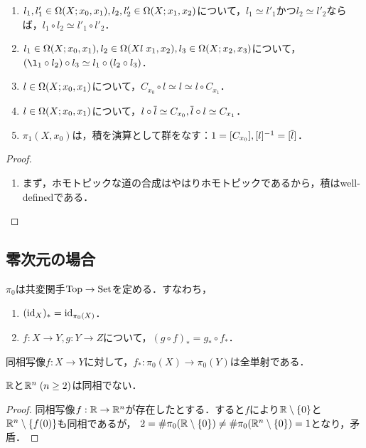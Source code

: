 \documentclass[uplatex,dvipdfmx]{jsreport}
\begin{document}
\begin{lemma}\mbox{}
    \begin{enumerate}
        \item $l_1,l'_1\in\Omega(X;x_0,x_1),l_2,l'_2\in\Omega(X;x_1,x_2)$について，$l_1\simeq l'_1$かつ$l_2\simeq l'_2$ならば，$l_1\circ l_2\simeq l'_1\circ l'_2$．
        \item $l_1\in\Omega(X;x_0,x_1),l_2\in\Omega(Xl\;x_1,x_2),l_3\in\Omega(X;x_2,x_3)$について，$(\l_1\circ l_2)\circ l_3\simeq l_1\circ(l_2\circ l_3)$．
        \item $l\in\Omega(X;x_0,x_1)$について，$C_{x_0}\circ l\simeq l\simeq l\circ C_{x_1}$．
        \item $l\in\Omega(X;x_0,x_1)$について，$l\circ\overline{l}\simeq C_{x_0},\overline{l}\circ l\simeq C_{x_1}$．
        \item $\pi_1(X,x_0)$は，積を演算として群をなす：$1=[C_{x_0}],[l]^{-1}=[\overline{l}]$．
    \end{enumerate}
\end{lemma}
\begin{proof}\mbox{}
    \begin{enumerate}
        \item まず，ホモトピックな道の合成はやはりホモトピックであるから，積はwell-definedである．
    \end{enumerate}
\end{proof}

\subsection{零次元の場合}

\begin{lemma}
    $\pi_0$は共変関手$\mathrm{Top}\to\mathrm{Set}$を定める．すなわち，
    \begin{enumerate}
        \item $(\mathrm{id}_X)_*=\mathrm{id}_{\pi_0(X)}$．
        \item $f:X\to Y,g:Y\to Z$について，$(g\circ f)_*=g_*\circ f_*$．
    \end{enumerate}
\end{lemma}

\begin{proposition}
    同相写像$f:X\to Y$に対して，$f_*:\pi_0(X)\to\pi_0(Y)$は全単射である．
\end{proposition}

\begin{corollary}
    $\mathbb{R}$と$\mathbb{R}^n\;(n\ge 2)$は同相でない．
\end{corollary}
\begin{proof}
    同相写像$f:\mathbb{R}\to\mathbb{R}^n$が存在したとする．すると$f$により$\mathbb{R}\setminus\{0\}$と$\mathbb{R}^n\setminus\{f(0)\}$も同相であるが，
    $2=\#\pi_0(\mathbb{R}\setminus\{0\})\ne\#\pi_0(\mathbb{R}^n\setminus\{0\})=1$となり，矛盾．
\end{proof}
\end{document}
